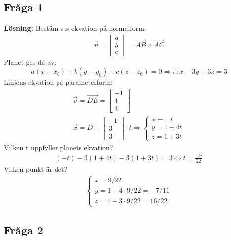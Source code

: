 \subsection{Fråga 1}
\textbf{Lösning: }
Bestäm  $\pi$:s ekvation på normalform:
\begin{gather*}
    \vec{n} = \begin{bmatrix} a\\b\\c \end{bmatrix} = \overrightarrow{AB} \times \overrightarrow{AC}
\end{gather*}
Planet ges då av:
\[
    a(x -x_0) + b(y - y_0) + c(z - z_0) = 0 \Rightarrow \pi: x -3y -3z = 3
\]
Linjens ekvation på parameterform:
\begin{gather*}
    \vec{v} = \overrightarrow{DE} = \begin{bmatrix} -1\\4\\3 \end{bmatrix}\\
    \vec{x} = D + \begin{bmatrix} -1\\3\\3 \end{bmatrix} \cdot t \Rightarrow
    \begin{cases}
        x = -t\\
        y = 1 + 4t\\
        z = 1 + 3t
    \end{cases}
\end{gather*}
Vilken t uppfyller planets ekvation?
\begin{gather*}
    (-t) -3 (1 + 4t) - 3(1 + 3t) = 3 \Leftrightarrow t = \frac{-9}{22}
\end{gather*}
Vilken punkt är det?
\begin{gather*}
    \begin{cases}
        x = 9/22\\
        y = 1 - 4 \cdot 9/22 = -7/11\\
        z = 1 - 3 \cdot 9/22 = 16/22
    \end{cases}
\end{gather*}
\subsection{Fråga 2}
